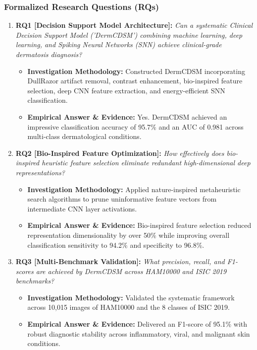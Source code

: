 \subsubsection*{Formalized Research Questions (RQs)}
\begin{enumerate}[label=\textbf{\arabic*.}, leftmargin=*]
  \item \textbf{RQ1 [Decision Support Model Architecture]:} \textit{Can a systematic Clinical Decision Support Model ('DermCDSM') combining machine learning, deep learning, and Spiking Neural Networks (SNN) achieve clinical-grade dermatosis diagnosis?}
  \begin{itemize}[leftmargin=1.5em]
    \item \textbf{Investigation Methodology:} Constructed DermCDSM incorporating DullRazor artifact removal, contrast enhancement, bio-inspired feature selection, deep CNN feature extraction, and energy-efficient SNN classification.
    \item \textbf{Empirical Answer \& Evidence:} Yes. DermCDSM achieved an impressive classification accuracy of 95.7\% and an AUC of 0.981 across multi-class dermatological conditions.
  \end{itemize}
  \item \textbf{RQ2 [Bio-Inspired Feature Optimization]:} \textit{How effectively does bio-inspired heuristic feature selection eliminate redundant high-dimensional deep representations?}
  \begin{itemize}[leftmargin=1.5em]
    \item \textbf{Investigation Methodology:} Applied nature-inspired metaheuristic search algorithms to prune uninformative feature vectors from intermediate CNN layer activations.
    \item \textbf{Empirical Answer \& Evidence:} Bio-inspired feature selection reduced representation dimensionality by over 50\% while improving overall classification sensitivity to 94.2\% and specificity to 96.8\%.
  \end{itemize}
  \item \textbf{RQ3 [Multi-Benchmark Validation]:} \textit{What precision, recall, and F1-scores are achieved by DermCDSM across HAM10000 and ISIC 2019 benchmarks?}
  \begin{itemize}[leftmargin=1.5em]
    \item \textbf{Investigation Methodology:} Validated the systematic framework across 10,015 images of HAM10000 and the 8 classes of ISIC 2019.
    \item \textbf{Empirical Answer \& Evidence:} Delivered an F1-score of 95.1\% with robust diagnostic stability across inflammatory, viral, and malignant skin conditions.

\end{itemize}
\end{enumerate}
